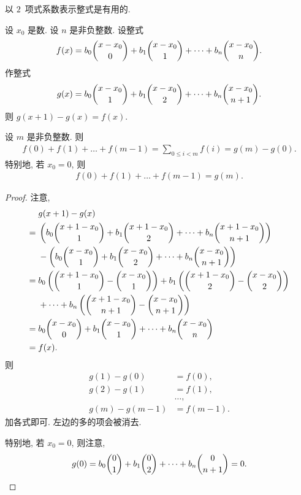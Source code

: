 \documentclass[../libro.tex]{subfiles}
\begin{document}
以 \(2\)~项式系数表示整式是有用的.

\begin{theorem}
    设 \(x_0\) 是数.
    设 \(n\) 是非负整数.
    设整式
    \begin{align*}
        f(x) = b_0 \dbinom{x-x_0}{0}
        + b_1 \dbinom{x-x_0}{1} + \dots + b_n \dbinom{x-x_0}{n}.
    \end{align*}
    作整式
    \begin{align*}
        g(x) = b_0 \dbinom{x-x_0}{1}
        + b_1 \dbinom{x-x_0}{2} + \dots + b_n \dbinom{x-x_0}{n+1}.
    \end{align*}
    则 \(g(x+1) - g(x) = f(x)\).

    设 \(m\) 是非负整数.
    则
    \begin{align*}
        f(0) + f(1) + \dots + f(m-1)
        = \sum_{0 \leq i < m} {f(i)}
        = g(m) - g(0).
    \end{align*}
    特别地, 若 \(x_0 = 0\), 则
    \begin{align*}
        f(0) + f(1) + \dots + f(m-1) = g(m).
    \end{align*}
\end{theorem}

\begin{proof}
    注意,
    \begin{align*}
        &
        g(x+1) - g(x)
        \\
        = {} &
        \left(
            b_0 \dbinom{x+1-x_0}{1}
            + b_1 \dbinom{x+1-x_0}{2} + \dots + b_n \dbinom{x+1-x_0}{n+1}
        \right)
        \\
        & -
        \left(
            b_0 \dbinom{x-x_0}{1}
            + b_1 \dbinom{x-x_0}{2} + \dots + b_n \dbinom{x-x_0}{n+1}
        \right)
        \\
        = {} &
        b_0 \left(\dbinom{x+1-x_0}{1} - \dbinom{x-x_0}{1}\right)
        + b_1 \left(\dbinom{x+1-x_0}{2} - \dbinom{x-x_0}{2}\right)
        \\
        &
        + \dots
        + b_n \left(\dbinom{x+1-x_0}{n+1} - \dbinom{x-x_0}{n+1}\right)
        \\
        = {} &
        b_0 \dbinom{x-x_0}{0} + b_1 \dbinom{x-x_0}{1}
        + \dots + b_n \dbinom{x-x_0}{n}
        \\
        = {} &
        f(x).
    \end{align*}
    则
    \begin{align*}
        g(1) - g(0) & = f(0), \\
        g(2) - g(1) & = f(1), \\
        & \dots, \\
        g(m) - g(m-1) & = f(m-1).
    \end{align*}
    加各式即可.
    左边的多的项会被消去.

    特别地, 若 \(x_0 = 0\), 则注意,
    \begin{equation*}
        g(0) = b_0 \dbinom{0}{1} + b_1 \dbinom{0}{2}
        + \dots + b_n \dbinom{0}{n+1} = 0.
        \qedhere
    \end{equation*}
\end{proof}
\end{document}

